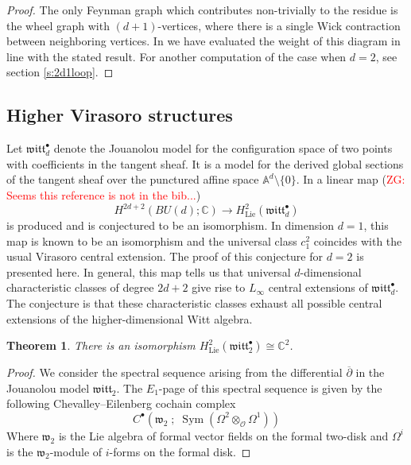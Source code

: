 \documentclass[11pt]{amsart}
\newtheorem{thm}{Theorem}[section]
\theoremstyle{definition}
\theoremstyle{remark}
\numberwithin{equation}{section}
\newcommand{\bu}{\bullet}
\newcommand{\op}{\operatorname}
\newcommand{\C}{\mathbb{C}}
\newcommand{\dbar}{\overline{\partial}}
\newcommand{\cO}{\mathcal{O}}
\newcommand{\Gui}[1]{(\textcolor{red}{ZG: #1})}
\begin{document}
\begin{proof}
  The only Feynman graph which contributes non-trivially to the residue is the wheel graph with $(d+1)$-vertices, where there is a single Wick contraction between neighboring vertices.
  In \cite{GWkm} we have evaluated the weight of this diagram in line with the stated result.
  For another computation of the case when $d=2$, see section \ref{s:2d1loop}.
\end{proof}


\subsection{Higher Virasoro structures}


Let $\mathfrak{witt}_d^\bu$ denote the Jouanolou model for the configuration space of two points with coefficients in
the tangent sheaf.
It is a model for the derived global sections of the tangent sheaf over the punctured affine space $\mathbb{A}^d
\setminus \{0\}$.
In \cite{bwvir2} a linear map \Gui{Seems this reference is not in the bib...}
\begin{equation}\label{}
  H^{2d+2}(BU(d) ; \mathbb{C}) \to H^2_{\op{Lie}} (\mathfrak{witt}_d^\bu)
\end{equation}
is produced and is conjectured to be an isomorphism.
In dimension $d=1$, this map is known to be an isomorphism and the universal class $c_1^2$ coincides with the usual
Virasoro central extension.
The proof of this conjecture for $d=2$ is presented here.
In general, this map tells us that universal $d$-dimensional characteristic classes of degree $2d+2$ give rise to $L_\infty$ central
extensions of $\mathfrak{witt}_d^\bu$.
The conjecture is that these characteristic classes exhaust all possible central extensions of the higher-dimensional
Witt algebra.

\begin{thm}
  There is an isomorphism $H^{2}_{\op{Lie}} (\mathfrak{witt}_2^\bu) \cong \C^2$.
\end{thm}

\begin{proof}
  We consider the spectral sequence arising from the differential $\dbar$ in the Jouanolou model $\mathfrak{witt}_2$.
  The $E_1$-page of this spectral sequence is given by the following Chevalley--Eilenberg cochain complex
  \begin{equation}\label{}
    C^\bu\left(\mathfrak{w}_2 \; ; \; \op{Sym} (\Omega^2 \otimes_{\cO} \Omega^1) \right)
  \end{equation}
  Where $\mathfrak{w}_2$ is the Lie algebra of formal vector fields on the formal two-disk and $\Omega^i$ is the
  $\mathfrak{w}_2$-module of $i$-forms on the formal disk.
\end{proof}
\end{document}
